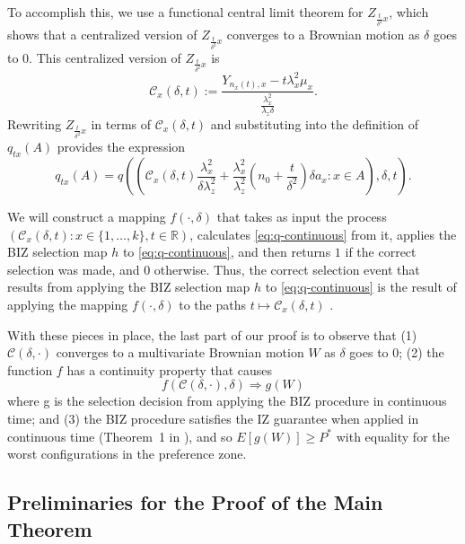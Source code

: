 \documentclass{wscpaperproc}
\theoremstyle{wsc}
\begin{document}
To accomplish this, we use a functional central limit theorem for
$Z_{\frac{t}{\delta^{2}}x}$, which shows that a centralized
version of $Z_{\frac{t}{\delta^{2}}x}$ converges to a Brownian motion as $\delta$ goes to $0$.
This centralized version of $Z_{\frac{t}{\delta^{2}}x}$ is 
\[
\mathcal{C}_{x}\left(\delta,t\right):=\frac{Y_{n_{x}\left(t\right),x}-t\lambda_{x}^{2}\mu_{x}}{\frac{\lambda_{x}^{2}}{\lambda_{z}\delta}}.
\]
Rewriting $Z_{\frac{t}{\delta^{2}}x}$ in terms of $\mathcal{C}_{x}\left(\delta,t\right)$ and substituting into the definition of $q_{tx}(A)$ provides the expression
\begin{equation}
    q_{tx}\left(A\right)=q\left(\left(\mathcal{C}_{x}\left(\delta,t\right)\frac{\lambda_{x}^{2}}{\delta\lambda_{z}^{2}}+\frac{\lambda_{x}^{2}}{\lambda_{z}^{2}}\left(n_{0}+\frac{t}{\delta^{2}}\right)\delta a_{x}:x\in A\right),\delta,t \right).
    \label{eq:q}
\end{equation}

We will construct a mapping $f\left(\cdot,\delta\right)$ that takes as input the process
$\left(\mathcal{C}_{x}\left(\delta,t\right) : x\in \{1,\ldots,k\}, t\in\mathbb{R}\right)$,
calculates 
\eqref{eq:q-continuous}
from it,
applies the BIZ selection map $h$ to \eqref{eq:q-continuous}, 
and then returns $1$ if the correct selection was made,
and $0$ otherwise.
Thus, the correct selection event that results from applying
the BIZ selection map $h$ to \eqref{eq:q-continuous} is the result
of applying the mapping $f\left(\cdot,\delta\right)$
to the paths $t\mapsto\mathcal{C}_{x}\left(\delta,t\right)$ .



With these pieces in place, the last part of our proof is to observe that (1) $\mathcal{C}\left(\delta,\cdot\right)$
converges to a multivariate Brownian motion $W$ as $\delta$ goes
to 0; (2) the function $f$ has a continuity property that causes
\[
f\left(\mathcal{C}\left(\delta,\cdot\right),\delta\right)\Rightarrow g\left(W\right)
\]
where g is the selection decision from applying the BIZ procedure
in continuous time; and (3) the BIZ procedure satisfies the IZ guarantee
when applied in continuous time (Theorem~1 in \cite{Frazier:BIZ}), and so $E[g(W)] \ge P^*$ with equality for the worst configurations in the preference zone.

\subsection{Preliminaries for the Proof of the Main Theorem}
\end{document}
